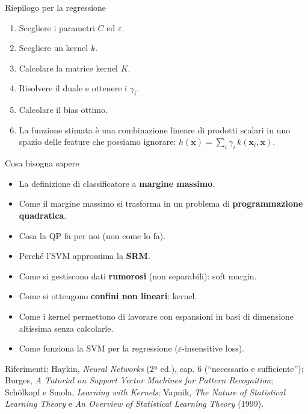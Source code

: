 \begin{boxabstract}{Riepilogo per la regressione}

\begin{enumerate}
\def\labelenumi{\arabic{enumi}.}
\tightlist
\item
  Scegliere i parametri \(C\) ed \(\varepsilon\).
\item
  Scegliere un kernel \(k\).
\item
  Calcolare la matrice kernel \(K\).
\item
  Risolvere il duale e ottenere i \(\gamma_i\).
\item
  Calcolare il bias ottimo.
\item
  La funzione stimata è una combinazione lineare di prodotti scalari in
  uno spazio delle feature che possiamo ignorare:
  \(h(\mathbf{x}) = \sum_i\gamma_i\,k(\mathbf{x}_i, \mathbf{x})\).
\end{enumerate}

\end{boxabstract}

\begin{boxquestion}{Cosa bisogna sapere}

\begin{itemize}
\tightlist
\item
  La definizione di classificatore a \textbf{margine massimo}.
\item
  Come il margine massimo si trasforma in un problema di
  \textbf{programmazione quadratica}.
\item
  Cosa la QP fa per noi (non come lo fa).
\item
  Perché l'SVM approssima la \textbf{SRM}.
\item
  Come si gestiscono dati \textbf{rumorosi} (non separabili): soft
  margin.
\item
  Come si ottengono \textbf{confini non lineari}: kernel.
\item
  Come i kernel permettono di lavorare con espansioni in basi di
  dimensione altissima senza calcolarle.
\item
  Come funziona la SVM per la regressione (\(\varepsilon\)-insensitive
  loss).
\end{itemize}

\end{boxquestion}

Riferimenti: Haykin, \emph{Neural Networks} (2ª ed.), cap. 6
(``necessario e sufficiente''); Burges, \emph{A Tutorial on Support
Vector Machines for Pattern Recognition}; Schölkopf e Smola,
\emph{Learning with Kernels}; Vapnik, \emph{The Nature of Statistical
Learning Theory} e \emph{An Overview of Statistical Learning Theory}
(1999).
